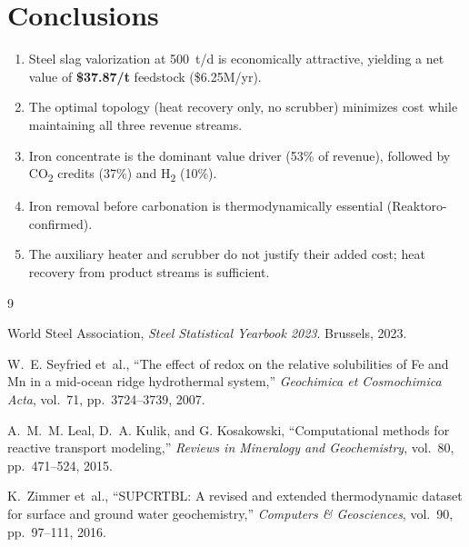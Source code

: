 \documentclass[11pt,a4paper]{article}
\begin{document}
\section{Conclusions}

\begin{enumerate}
    \item Steel slag valorization at \SI{500}{t/d} is economically attractive, yielding
          a net value of \textbf{\$\num{37.87}/t} feedstock (\$\num{6.25}M/yr).
    \item The optimal topology (heat recovery only, no scrubber) minimizes cost while
          maintaining all three revenue streams.
    \item Iron concentrate is the dominant value driver (53\% of revenue), followed by
          CO\textsubscript{2} credits (37\%) and H\textsubscript{2} (10\%).
    \item Iron removal before carbonation is thermodynamically essential (Reaktoro-confirmed).
    \item The auxiliary heater and scrubber do not justify their added cost; heat recovery
          from product streams is sufficient.
\end{enumerate}


\begin{thebibliography}{9}

World Steel Association,
\emph{Steel Statistical Yearbook 2023}.
Brussels, 2023.

W.~E. Seyfried et~al.,
``The effect of redox on the relative solubilities of Fe and Mn in a mid-ocean ridge
hydrothermal system,''
\emph{Geochimica et Cosmochimica Acta}, vol.~71, pp.~3724--3739, 2007.

A.~M.~M. Leal, D.~A. Kulik, and G. Kosakowski,
``Computational methods for reactive transport modeling,''
\emph{Reviews in Mineralogy and Geochemistry}, vol.~80, pp.~471--524, 2015.

K.~Zimmer et~al.,
``SUPCRTBL: A revised and extended thermodynamic dataset for surface and ground water
geochemistry,''
\emph{Computers \& Geosciences}, vol.~90, pp.~97--111, 2016.

\end{thebibliography}
\end{document}
